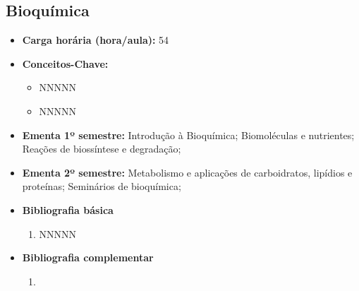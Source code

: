 \documentclass[11pt,fleqn]{book} %
\begin{document}
\subsection{Bioquímica}\label{disc:bioquimica}
\begin{itemize}
	\item \textbf{Carga horária (hora/aula):} 54
	\item \textbf{Conceitos-Chave:}
	\begin{itemize}
		\item NNNNN
		\item NNNNN
	\end{itemize}
	\item \textbf{Ementa 1º semestre:}
	Introdução à Bioquímica; 
	Biomoléculas e nutrientes;
	Reações de biossíntese e degradação;
	\item \textbf{Ementa 2º semestre:}	
	Metabolismo e aplicações de carboidratos, lipídios e proteínas;
	Seminários de bioquímica;
	\item \textbf{Bibliografia básica}
	\begin{enumerate}
		\item NNNNN
	\end{enumerate}
	\item \textbf{Bibliografia complementar}
	\begin{enumerate}
		\item 
	\end{enumerate}	
\end{itemize}


\newpage
\end{document}
